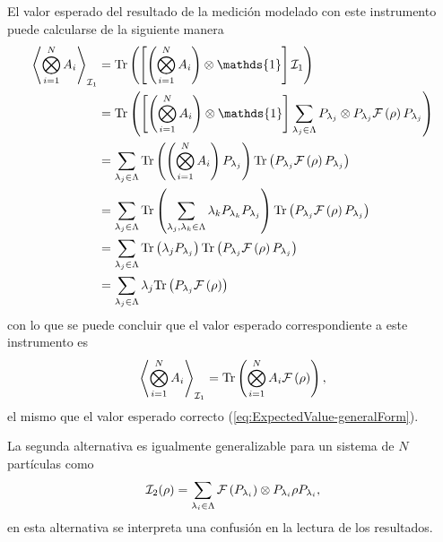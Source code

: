 \documentclass[12pt,oneside]{book}\raggedbottom{}
\begin{document}
El valor esperado del resultado de la medición modelado con este instrumento puede calcularse de la siguiente manera \begin{equation*}
    \begin{split}
        \left \la \prodtensor A_i \right \ra_{\mathcal{I}_1}&=\tr\left( \left[\left(\prodtensor A_i\right) \otimes \mathds{1}\right]\mathcal{I}_1\right) \\
        &=\tr\left(\left[ \left(\prodtensor A_i\right)\otimes \mathds{1}\right]\sum_{\lambda_j \in \Lambda}P_{\lambda_j}\otimes P_{\lambda_j}\fuzzy{\rho}P_{\lambda_j} \right)\\
        &=\sum_{\lambda_j\in \Lambda} \tr\left(\left(\prodtensor A_i\right) P_{\lambda_j}\right) \tr\left(P_{\lambda_j}\fuzzy{\rho} P_{\lambda_j}\right) \\
        &=\sum_{\lambda_j\in \Lambda} \tr\left(\sum_{{\lambda_j, \lambda_k \in \Lambda}}\lambda_k P_{\lambda_k} P_{\lambda_j}\right) \tr\left(P_{\lambda_j}\fuzzy{\rho} P_{\lambda_j}\right)  \\
        &=\sum_{\lambda_j \in\Lambda} \tr\left(\lambda_j P_{\lambda_j}\right) \tr\left(P_{\lambda_j}\fuzzy{\rho}P_{\lambda_j}\right) \\
        &=\sum_{\lambda_j \in \Lambda} \lambda_j \tr\left(P_{\lambda_j}\fuzzy{\rho}\right) \\
    \end{split}
\end{equation*} con lo que se puede concluir que el valor esperado correspondiente a este instrumento es \begin{equation}\label{eq:valor-esperado-1instrumentnp}
        \left \langle \bigotimes_{i=1}^{N} A_i \right \rangle_{\mathcal{I}_1}= {\rm Tr}\left( \bigotimes_{i=1}^{N} A_i \mathcal{F}\left(\rho\right)\right),
\end{equation}el mismo que el valor esperado correcto ({\ref{eq:ExpectedValue-generalForm}}).

La segunda alternativa es igualmente generalizable para un sistema de $N$ partículas como \begin{equation}\label{eq:second-instrumentnp}
    \mathcal{I}_2(\rho)= \sum_{\lambda_i \in \Lambda } \mathcal{F}\left(P_{\lambda_i}\right)\otimes P_{\lambda_i}\rho P_{\lambda_i},
\end{equation}  en esta alternativa se interpreta una confusión en la lectura de los resultados.
\end{document}
